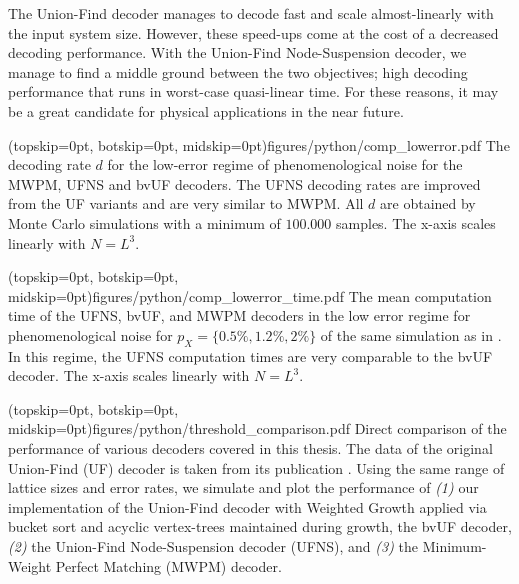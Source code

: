 The Union-Find decoder manages to decode fast and scale almost-linearly with the input system size. However, these speed-ups come at the cost of a decreased decoding performance. With the Union-Find Node-Suspension decoder, we manage to find a middle ground between the two objectives; high decoding performance that runs in worst-case quasi-linear time. For these reasons, it may be a great candidate for physical applications in the near future.

\Figure[b!](topskip=0pt, botskip=0pt, midskip=0pt){figures/python/comp_lowerror.pdf}{
  The decoding rate $d$ for the low-error regime of phenomenological noise for the MWPM, UFNS and bvUF decoders. The UFNS decoding rates are improved from the UF variants and are very similar to MWPM. All $d$ are obtained by Monte Carlo simulations with a minimum of $100.000$ samples. The x-axis scales linearly with $N = L^3$.\label{comp_lowerror}}

\Figure[b!](topskip=0pt, botskip=0pt, midskip=0pt){figures/python/comp_lowerror_time.pdf}{
  The mean computation time of the UFNS, bvUF, and MWPM decoders in the low error regime for phenomenological noise for $p_X = \{0.5\%, 1.2\%, 2\%\}$ of the same simulation as in . In this regime, the UFNS computation times are very comparable to the bvUF decoder. The x-axis scales linearly with $N = L^3$. \label{comp_lowerror_time}}


\Figure[htb](topskip=0pt, botskip=0pt, midskip=0pt){figures/python/threshold_comparison.pdf}{
  Direct comparison of the performance of various decoders covered in this thesis. The data of the original Union-Find (UF) decoder is taken from its publication \cite{delfosse2017almost}. Using the same range of lattice sizes and error rates, we simulate and plot the performance of \emph{(1)} our implementation of the Union-Find decoder with Weighted Growth applied via bucket sort and acyclic vertex-trees maintained during growth, the bvUF decoder, \emph{(2)} the Union-Find Node-Suspension decoder (UFNS), and  \emph{(3)} the Minimum-Weight Perfect Matching (MWPM) decoder.\label{thres_comp}}